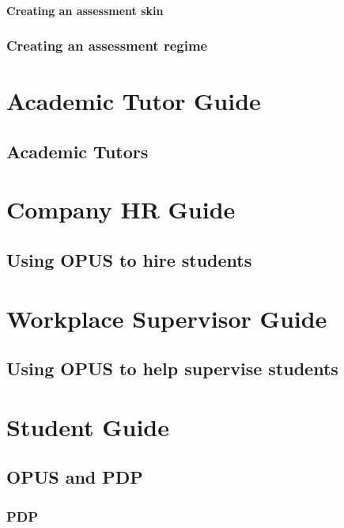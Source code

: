 \documentclass[12 pt]{book}
\begin{document}
\subsection{Creating an assessment skin}

\section{Creating an assessment regime}

%
%
%

\part{Academic Tutor Guide}

\chapter{Academic Tutors}

\part{Company HR Guide}

\chapter{Using OPUS to hire students}

\part{Workplace Supervisor Guide}

\chapter{Using OPUS to help supervise students}

\part{Student Guide}

%
%
%

\chapter{OPUS and PDP}

\section{PDP}
\end{document}
